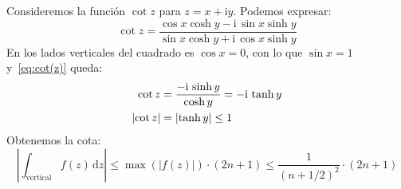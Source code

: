   Consideremos la función \(\cot z\) para \(z = x + \mathrm{i} y\).
  Podemos expresar:
  \begin{equation}
    \label{eq:cot(z)}
    \cot z
      = \frac{\cos x \cosh y - \mathrm{i} \, \sin x \sinh y}
	     {\sin x \cosh y + \mathrm{i} \, \cos x \sinh y}
  \end{equation}
  En los lados verticales del cuadrado es \(\cos x = 0\),
  con lo que \(\sin x = 1\) y~\eqref{eq:cot(z)} queda:
  \begin{align}
    \cot z
      &= \frac{- \mathrm{i} \, \sinh y}{\cosh y}
       = - \mathrm{i} \, \tanh y \notag \\
    \lvert \cot z \rvert
      &= \lvert \tanh y \rvert
       \le 1 \label{eq:complex-cot-vertical-bound}
  \end{align}
  Obtenemos la cota:
  \begin{equation*}
    \left\lvert
	\int_\text{vertical} f(z) \, \mathrm{d} z
    \right\rvert
      \le \max( \lvert f(z) \rvert) \cdot (2 n + 1)
      \le \frac{1}{(n + 1/2)^2} \cdot (2 n + 1)
  \end{equation*}

